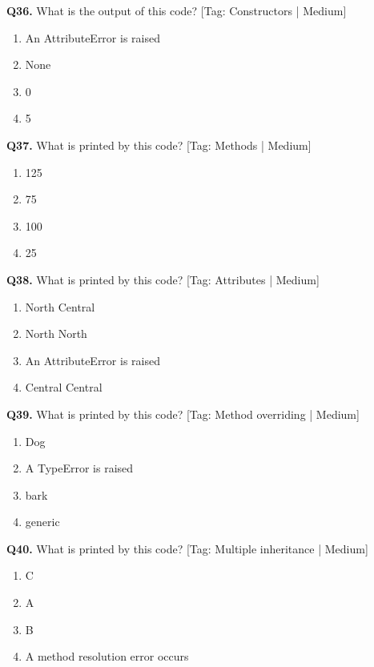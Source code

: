 \vspace{2mm}
\noindent\textbf{Q36.} What is the output of this code? \hfill [Tag: Constructors | Medium]
\begin{enumerate}[label=(\alph*),topsep=2pt,itemsep=1pt,partopsep=0pt,parsep=0pt]
    \item {An AttributeError is raised}
    \item {None}
    \item {0}
    \item {5}
\end{enumerate}
\vspace{2mm}
\noindent\textbf{Q37.} What is printed by this code? \hfill [Tag: Methods | Medium]
\begin{enumerate}[label=(\alph*),topsep=2pt,itemsep=1pt,partopsep=0pt,parsep=0pt]
    \item {125}
    \item {75}
    \item {100}
    \item {25}
\end{enumerate}
\vspace{2mm}
\noindent\textbf{Q38.} What is printed by this code? \hfill [Tag: Attributes | Medium]
\begin{enumerate}[label=(\alph*),topsep=2pt,itemsep=1pt,partopsep=0pt,parsep=0pt]
    \item {North Central}
    \item {North North}
    \item {An AttributeError is raised}
    \item {Central Central}
\end{enumerate}
\vspace{2mm}
\noindent\textbf{Q39.} What is printed by this code? \hfill [Tag: Method overriding | Medium]
\begin{enumerate}[label=(\alph*),topsep=2pt,itemsep=1pt,partopsep=0pt,parsep=0pt]
    \item {Dog}
    \item {A TypeError is raised}
    \item {bark}
    \item {generic}
\end{enumerate}
\vspace{2mm}
\noindent\textbf{Q40.} What is printed by this code? \hfill [Tag: Multiple inheritance | Medium]
\begin{enumerate}[label=(\alph*),topsep=2pt,itemsep=1pt,partopsep=0pt,parsep=0pt]
    \item {C}
    \item {A}
    \item {B}
    \item {A method resolution error occurs}
\end{enumerate}

